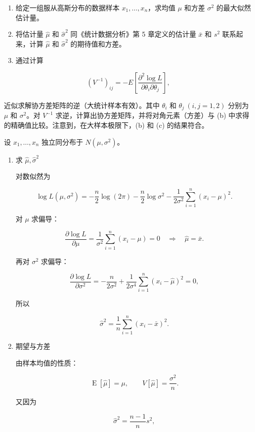 ﻿


\begin{question}
\begin{enumerate}
\item
  给定一组服从高斯分布的数据样本 \(x_1,\ldots,x_n\)，求均值 \(\mu\)
  和方差 \(\sigma^2\) 的最大似然估计量。
\item
  将估计量 \(\hat\mu\) 和 \(\hat\sigma^2\) 同《统计数据分析》第 5
  章定义的估计量 \(\bar x\) 和 \(s^2\) 联系起来，计算 \(\hat\mu\) 和
  \(\hat\sigma^2\) 的期待值和方差。
\item
  通过计算
\end{enumerate}

\[
(V^{-1})_{ij}=-E\left[\frac{\partial^2\log L}{\partial\theta_i\partial\theta_j}\right],
\]

近似求解协方差矩阵的逆（大统计样本有效）。其中 \(\theta_i\) 和
\(\theta_j\ (i,j=1,2)\) 分别为 \(\mu\) 和 \(\sigma^2\)。对 \(V^{-1}\)
求逆，计算出协方差矩阵，并将对角元素（方差）与 (b)
中求得的精确值比较。注意到，在大样本极限下，(b) 和 (c) 的结果符合。
\begin{solution}
设 \(x_1,\dots,x_n\) 独立同分布于 \(N(\mu,\sigma^2)\)。

\begin{enumerate}
\item 求 \(\hat\mu,\hat\sigma^2\)

对数似然为

\[
\log L(\mu,\sigma^2)
=-\frac n2\log(2\pi)-\frac n2\log\sigma^2-
\frac1{2\sigma^2}\sum_{i=1}^n (x_i-\mu)^2.
\]

对 \(\mu\) 求偏导：

\[
\frac{\partial\log L}{\partial\mu}
=\frac1{\sigma^2}\sum_{i=1}^n(x_i-\mu)=0
\quad\Rightarrow\quad
\hat\mu=\bar x.
\]

再对 \(\sigma^2\) 求偏导：

\[
\frac{\partial\log L}{\partial\sigma^2}
=-\frac{n}{2\sigma^2}+\frac1{2\sigma^4}\sum_{i=1}^n(x_i-\hat\mu)^2=0,
\]

所以

\[
\hat\sigma^2=\frac1n\sum_{i=1}^n(x_i-\bar x)^2.
\]

\item 期望与方差

由样本均值的性质：

\[
\operatorname{E}[\hat\mu]=\mu,\qquad V[\hat\mu]=\frac{\sigma^2}{n}.
\]

又因为

\[
\hat\sigma^2=\frac{n-1}{n}s^2,
\]


\end{enumerate}
\end{solution}
\end{question}
